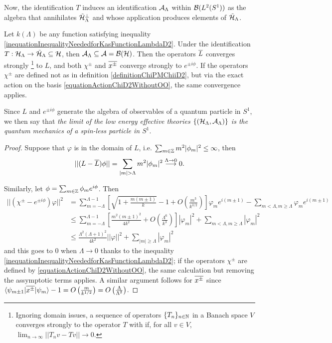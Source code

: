 Now, the identification $T$ induces an identification $\mathcal A_\Lambda$ within $\mathcal B(L^2(S^1))$ as the algebra that annihilates $\tilde {\mathcal H}_\Lambda^\perp$ and whose application produces elements of $\tilde {\mathcal H}_\Lambda$. 

\begin{theorem}\label{theoremConvergesToQMD2}
Let $k(\Lambda)$ be any function satisfying inequality \eqref{inequationInequalityNeededforKasFunctionLambdaD2}. Under the identification $T: \mathcal H_\Lambda \to \tilde {\mathcal H}_\Lambda \subseteq \mathcal H$, then $\mathcal A_\Lambda \subseteq \mathcal A = \mathcal B (\mathcal H)$. Then the operators $\overline{L} $ converges strongly
\footnote{Ignoring domain issues, a sequence of operators $\{T_n\}_{n \in \mathbb{N}}$ in a Banach space $V$ converges strongly to the operator $T$ with if, for all $v \in V$, $\lim_{n \to \infty} ||T_n v - T v|| \to 0$.}
 to $L$, and both $\chi^\pm$ and $\overline{x^\pm}$ converge strongly to $e^{\pm i\phi}$. If the operators $\chi^\pm$ are defined not as in definition \ref{definitionChiPMChiiD2}, but via the exact action on the basis \eqref{equationActionChiD2WithoutOO}, the same convergence applies.

\noindent Since $L$ and $e^{\pm i \phi}$ generate the algebra of observables of a quantum particle in $S^1$, we then say that \emph{the limit of the low energy effective theories $\{(\mathcal H_\Lambda, \mathcal A_\Lambda)\}$ is the quantum mechanics of a spin-less particle in $S^1$}.

\end{theorem}

\begin{proof}
Suppose that $\varphi$ is in the domain of $L$, i.e. $\sum_{m \in \ZZ} m^2 |\phi_m|^2 \leq \infty$, then
\begin{align*}
    ||(L - \cut L)\varphi|| = \sum_{|m| > \Lambda} m^2 |\phi_m|^2 \overset{\Lambda \to 0}{\longrightarrow} 0.
\end{align*}

Similarly, let $\varphi = \sum_{m \in \ZZ} \varphi_m e^{i \phi}$. Then
\begin{align*}
    ||(\chi^\pm - e^{\pm i \phi})\varphi||^2 &= \sum_{m = - \Lambda}^{\Lambda-1} \left[ \sqrt{1 + \frac{m(m \pm 1)}{k}} - 1 + O\left(\frac{m^3}{k^{3/2}} \right)\right] \varphi_m e^{i(m \pm 1)} - \sum_{m < \Lambda, m \geq \Lambda} \varphi_m e^{i(m \pm 1)}\\
    &\leq \sum_{m = -\Lambda}^{\Lambda-1} \left[\frac{m^2(m\pm 1)^2}{4k^2} + O\left(\frac{\Lambda^6}{k^{3}} \right)\right] |\varphi_m|^2 + \sum_{m < \Lambda, m \geq \Lambda} |\varphi_m|^2 \\
    &\leq \frac{\Lambda^2(\Lambda+1)^2}{4k^2} ||\varphi||^2 + \sum_{|m|\geq \Lambda} |\varphi_m|^2
\end{align*}
and this goes to $0$ when $\Lambda \to 0$ thanks to the inequality \eqref{inequationInequalityNeededforKasFunctionLambdaD2}; if the operators $\chi^\pm$ are defined by \eqref{equationActionChiD2WithoutOO}, the same calculation but removing the assymptotic terms applies. A similar argument follows for $\overline{x^\pm}$ since $\langle\psi_{m\pm 1} | \overline{x^\pm} | \psi_m\rangle - 1 = O\left(\frac{m}{k^{1/2}}\right) = O\left(\frac{\Lambda}{\Lambda^2} \right)$.
\end{proof}

